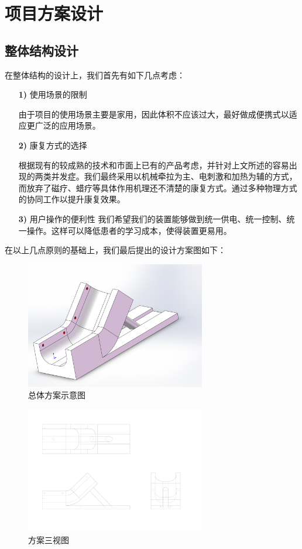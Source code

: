 \documentclass[UTF8]{ctexart}
\begin{document}
\section{项目方案设计}
    \subsection{整体结构设计}
        在整体结构的设计上，我们首先有如下几点考虑：
        \begin{enumerate}
            \item[\textbf{1)}]使用场景的限制
            
            由于项目的使用场景主要是家用，因此体积不应该过大，最好做成便携式以适应更广泛的应用场景。
            \item[\textbf{2)}]康复方式的选择
            
            根据现有的较成熟的技术和市面上已有的产品考虑，并针对上文所述的容易出现的两类并发症。我们最终采用以机械牵拉为主、电刺激和加热为辅的方式，而放弃了磁疗、蜡疗等具体作用机理还不清楚的康复方式。通过多种物理方式的协同工作以提升康复效果。
            
            \item[\textbf{3)}]用户操作的便利性
                我们希望我们的装置能够做到统一供电、统一控制、统一操作。这样可以降低患者的学习成本，使得装置更易用。 
        \end{enumerate}
        在以上几点原则的基础上，我们最后提出的设计方案图如下：
        \begin{figure}[H]
            \centering
            \includegraphics[width=0.7\textwidth]{General_Design.pdf}
            \caption{总体方案示意图}
            \label{General}
        \end{figure}
        \begin{figure}[H]
            \centering
            \includegraphics[width=0.7\textwidth]{3D_Figure.pdf}
            \caption{方案三视图}
        \end{figure}
\end{document}
